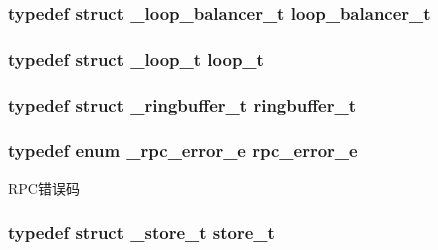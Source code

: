 \subsubsection[{loop\+\_\+balancer\+\_\+t}]{\setlength{\rightskip}{0pt plus 5cm}typedef struct {\bf \+\_\+loop\+\_\+balancer\+\_\+t} {\bf loop\+\_\+balancer\+\_\+t}}\label{a00044_a649c7e850ab247b5f70ad27e335a129d_a649c7e850ab247b5f70ad27e335a129d}
\hypertarget{a00044_a9c3ad1cd2de83e09f3a7b59fa82c94ee_a9c3ad1cd2de83e09f3a7b59fa82c94ee}{}
\subsubsection[{loop\+\_\+t}]{\setlength{\rightskip}{0pt plus 5cm}typedef struct {\bf \+\_\+loop\+\_\+t} {\bf loop\+\_\+t}}\label{a00044_a9c3ad1cd2de83e09f3a7b59fa82c94ee_a9c3ad1cd2de83e09f3a7b59fa82c94ee}
\hypertarget{a00044_af929c5cf86b6a0f64dde407dfe60482e_af929c5cf86b6a0f64dde407dfe60482e}{}
\subsubsection[{ringbuffer\+\_\+t}]{\setlength{\rightskip}{0pt plus 5cm}typedef struct {\bf \+\_\+ringbuffer\+\_\+t} {\bf ringbuffer\+\_\+t}}\label{a00044_af929c5cf86b6a0f64dde407dfe60482e_af929c5cf86b6a0f64dde407dfe60482e}
\hypertarget{a00044_aba1e847dfcabe31256c7f60abe0272a6_aba1e847dfcabe31256c7f60abe0272a6}{}
\subsubsection[{rpc\+\_\+error\+\_\+e}]{\setlength{\rightskip}{0pt plus 5cm}typedef enum {\bf \+\_\+rpc\+\_\+error\+\_\+e}  {\bf rpc\+\_\+error\+\_\+e}}\label{a00044_aba1e847dfcabe31256c7f60abe0272a6_aba1e847dfcabe31256c7f60abe0272a6}
R\+P\+C错误码 \hypertarget{a00044_ac5e23aa8669eede04d771010dbd201b4_ac5e23aa8669eede04d771010dbd201b4}{}
\subsubsection[{store\+\_\+t}]{\setlength{\rightskip}{0pt plus 5cm}typedef struct {\bf \+\_\+store\+\_\+t} {\bf store\+\_\+t}}\label{a00044_ac5e23aa8669eede04d771010dbd201b4_ac5e23aa8669eede04d771010dbd201b4}
\hypertarget{a00044_a261dba04f46f5c59a68a05f69f5a65a8_a261dba04f46f5c59a68a05f69f5a65a8}{}
